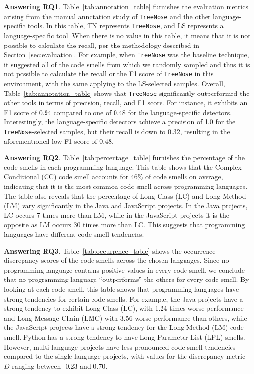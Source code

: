 


{\bf Answering RQ1}. Table~\ref{tab:annotation_table} furnishes the evaluation
metrics arising from the manual annotation study of \texttt{TreeNose} and the
other language-specific tools.
%
In this table, TN represents \texttt{TreeNose}, and LS represents a
language-specific tool.
%
When there is no value in this table, it means that it is not possible to
calculate the recall, per the methodology described in
Section~\ref{sec:evaluation}.
%
For example, when \texttt{TreeNose} was the baseline technique, it suggested
all of the code smells from which we randomly sampled and thus it is not
possible to calculate the recall or the F1 score of \texttt{TreeNose} in this
environment, with the same applying to the LS-selected samples.
%
Overall, Table~\ref{tab:annotation_table} shows that \texttt{TreeNose}
significantly outperformed the other tools in terms of precision, recall, and
F1 score.
%
For instance, it exhibits an F1 score of 0.94 compared to one of 0.48 for the
language-specific detectors.
%
Interestingly, the language-specific detectors achieve a precision of 1.0 for
the \texttt{TreeNose}-selected samples, but their recall is down to 0.32,
resulting in the aforementioned low F1 score of 0.48.


{\bf Answering RQ2}. Table~\ref{tab:percentage_table} furnishes the percentage
of the code smells in each programming language. This table shows that the
Complex Conditional (CC) code smell accounts for 46\% of code smells on
average, indicating that it is the most common code smell across programming
languages.
%
The table also reveals that the percentage of Long Class (LC) and Long Method
(LM) vary significantly in the Java and JavaScript projects. In the Java
projects, LC occurs 7 times more than LM, while in the JavaScript projects it
is the opposite as LM occurs 30 times more than LC. This suggests that
programming languages have different code smell tendencies.

{\bf Answering RQ3}. Table~\ref{tab:occurrence_table} shows the occurrence
discrepancy scores of the code smells across the chosen languages. Since no
programming language contains positive values in every code smell, we conclude
that no programming language ``outperforms'' the others for every code smell.
By looking at each code smell, this table shows that programming languages have
strong tendencies for certain code smells.
%
For example, the Java projects have a strong tendency to exhibit Long Class
(LC), with 1.24 times worse performance and Long Message Chain (LMC) with 3.56
worse performance than others, while the JavaScript projects have a strong
tendency for the Long Method (LM) code smell. Python has a strong tendency to
have Long Parameter List (LPL) smells. However, multi-language projects have
less pronounced code smell tendencies compared to the single-language projects,
with values for the discrepancy metric $D$ ranging between -0.23 and 0.70.

